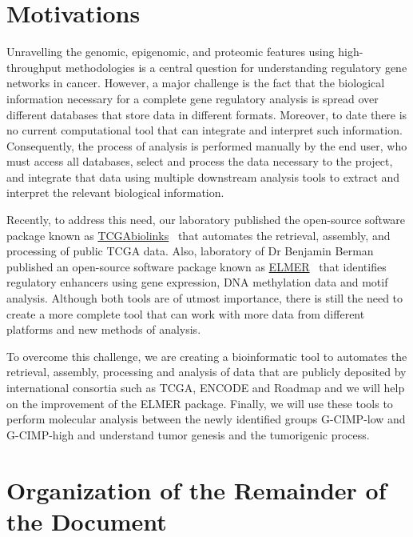 \section{Motivations}

Unravelling the genomic, epigenomic, and proteomic features using high-throughput methodologies is a central question for understanding regulatory gene networks in cancer. However, a major challenge is the fact that the biological information necessary for a complete gene regulatory analysis is spread over different databases that store data in different formats. Moreover, to date there is no current computational tool that can integrate and interpret such information. Consequently, the process of analysis is performed manually by the end user, who must access all databases, select and process the data necessary to the project, and integrate that data using multiple downstream analysis tools to extract and interpret the relevant biological information.

Recently, to address this need, our laboratory published the open-source software package known as \href{http://bioconductor.org/packages/TCGAbiolinks/}{TCGAbiolinks}~\cite{TCGAbiolinks} that automates the retrieval, assembly, and processing of public TCGA data. Also, laboratory of Dr Benjamin Berman published an open-source software package known as \href{http://bioconductor.org/packages/ELMER/}{ELMER}~\cite{yao2015inferring} that identifies regulatory enhancers using gene expression, DNA methylation data and motif analysis. Although both tools are of utmost importance, there is still the need to create a more complete tool that can work with more data from different platforms and new methods of analysis.

To overcome this challenge, we are creating a bioinformatic tool to automates the retrieval, assembly, processing and analysis of data that are publicly deposited by international consortia such as TCGA, ENCODE and Roadmap and we will help on the improvement of the ELMER package. Finally, we will use these tools to perform molecular analysis between the newly identified groups G-CIMP-low and G-CIMP-high and understand tumor genesis and the tumorigenic process.



\section{Organization of the Remainder of the Document}

